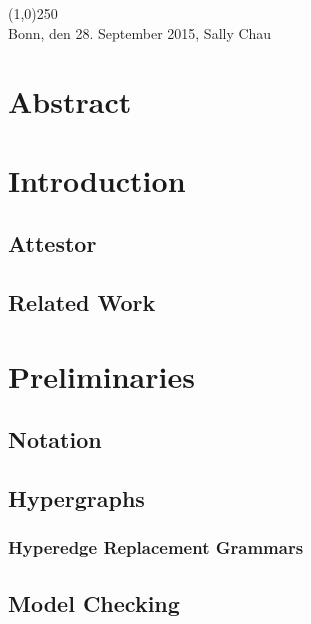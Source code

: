 \documentclass[a4paper, 12pt, twoside]{report}
\theoremstyle{plain}
\begin{document}
	\noindent\line(1,0){250}\\
	Bonn, den 28. September 2015, Sally Chau
	
	\clearpage\mbox{}\clearpage
	
	\chapter*{Abstract}
	
	\clearpage\mbox{}\clearpage
	
	\doublespacing
	\tableofcontents
	\singlespacing
	\clearpage\mbox{}\clearpage
	\thispagestyle{empty} 
	
	\pagestyle{fancy}
	\fancyhead[RE]{\nouppercase\leftmark}
	\fancyhead[LO]{\nouppercase\rightmark}
	\fancyhead[LE,RO]{\thepage}
	\cfoot{}
	
	
	\chapter{Introduction}
	
	\section{Attestor}
	
	\section{Related Work}
	
	\chapter{Preliminaries}
	
	\section{Notation}
	
	\section{Hypergraphs}
	\subsection{Hyperedge Replacement Grammars}
	
	\section{Model Checking}
	
\end{document}
